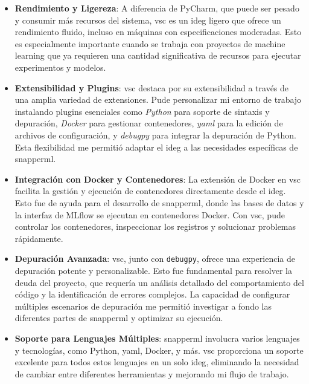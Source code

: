 \begin{itemize}
    \item \textbf{Rendimiento y Ligereza}: A diferencia de PyCharm, que puede ser pesado y consumir más recursos del sistema, \acrshort{vsc} es un \Gls{ideg} ligero que ofrece un rendimiento fluido, incluso en máquinas con especificaciones moderadas. Esto es especialmente importante cuando se trabaja con proyectos de machine learning que ya requieren una cantidad significativa de recursos para ejecutar experimentos y modelos.
    \item \textbf{Extensibilidad y Plugins}: \acrlong{vsc} destaca por su extensibilidad a través de una amplia variedad de extensiones. Pude personalizar mi entorno de trabajo instalando plugins esenciales como \textit{Python} para soporte de sintaxis y depuración, \textit{Docker} para gestionar contenedores, \textit{\acrshort{yaml}} para la edición de archivos de configuración, y \textit{debugpy} para integrar la depuración de Python. Esta flexibilidad me permitió adaptar el \Gls{ideg} a las necesidades específicas de \Gls{snapperml}.

    \item \textbf{Integración con Docker y Contenedores}: La extensión de Docker en \acrshort{vsc} facilita la gestión y ejecución de contenedores directamente desde el \Gls{ideg}. Esto fue de ayuda para el desarrollo de \Gls{snapperml}, donde las bases de datos y la interfaz de MLflow se ejecutan en contenedores Docker. Con \acrshort{vsc}, pude controlar los contenedores, inspeccionar los registros y solucionar problemas rápidamente.

    \item \textbf{Depuración Avanzada}: \acrshort{vsc}, junto con \texttt{debugpy}, ofrece una experiencia de depuración potente y personalizable. Esto fue fundamental para resolver la \gls{deuda} del proyecto, que requería un análisis detallado del comportamiento del código y la identificación de errores complejos. La capacidad de configurar múltiples escenarios de depuración me permitió investigar a fondo las diferentes partes de \Gls{snapperml} y optimizar su ejecución.

    \item \textbf{Soporte para Lenguajes Múltiples}: \Gls{snapperml} involucra varios lenguajes y tecnologías, como Python, \acrshort{yaml}, Docker, y más. \acrshort{vsc} proporciona un soporte excelente para todos estos lenguajes en un solo \Gls{ideg}, eliminando la necesidad de cambiar entre diferentes herramientas y mejorando mi flujo de trabajo.


\end{itemize}
